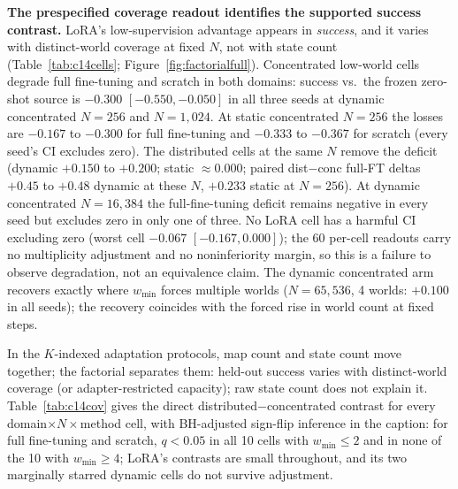 \documentclass[letterpaper]{article} %
\begin{document}
\textbf{The prespecified coverage readout identifies the supported success contrast.} LoRA's low-supervision advantage appears in \emph{success}, and it varies with distinct-world coverage at fixed $N$, not with state count (Table~\ref{tab:c14cells}; Figure~\ref{fig:factorialfull}). Concentrated low-world cells degrade full fine-tuning and scratch in both domains: success vs.\ the frozen zero-shot source is $-0.300$ $[-0.550,-0.050]$ in all three seeds at dynamic concentrated $N{=}256$ and $N{=}1{,}024$. At static concentrated $N{=}256$ the losses are $-0.167$ to $-0.300$ for full fine-tuning and $-0.333$ to $-0.367$ for scratch (every seed's CI excludes zero). The distributed cells at the same $N$ remove the deficit (dynamic $+0.150$ to $+0.200$; static $\approx 0.000$; paired dist$-$conc full-FT deltas $+0.45$ to $+0.48$ dynamic at these $N$, $+0.233$ static at $N{=}256$). At dynamic concentrated $N{=}16{,}384$ the full-fine-tuning deficit remains negative in every seed but excludes zero in only one of three. No LoRA cell has a harmful CI excluding zero (worst cell $-0.067$ $[-0.167, 0.000]$); the 60 per-cell readouts carry no multiplicity adjustment and no noninferiority margin, so this is a failure to observe degradation, not an equivalence claim. The dynamic concentrated arm recovers exactly where $w_{\min}$ forces multiple worlds ($N{=}65{,}536$, 4 worlds: $+0.100$ in all seeds); the recovery coincides with the forced rise in world count at fixed steps.

In the $K$-indexed adaptation protocols, map count and state count move together; the factorial separates them: held-out success varies with distinct-world coverage (or adapter-restricted capacity); raw state count does not explain it. Table~\ref{tab:c14cov} gives the direct distributed$-$concentrated contrast for every domain$\times N\times$method cell, with BH-adjusted sign-flip inference in the caption: for full fine-tuning and scratch, $q{<}0.05$ in all 10 cells with $w_{\min} \leq 2$ and in none of the 10 with $w_{\min} \geq 4$; LoRA's contrasts are small throughout, and its two marginally starred dynamic cells do not survive adjustment.
\end{document}
